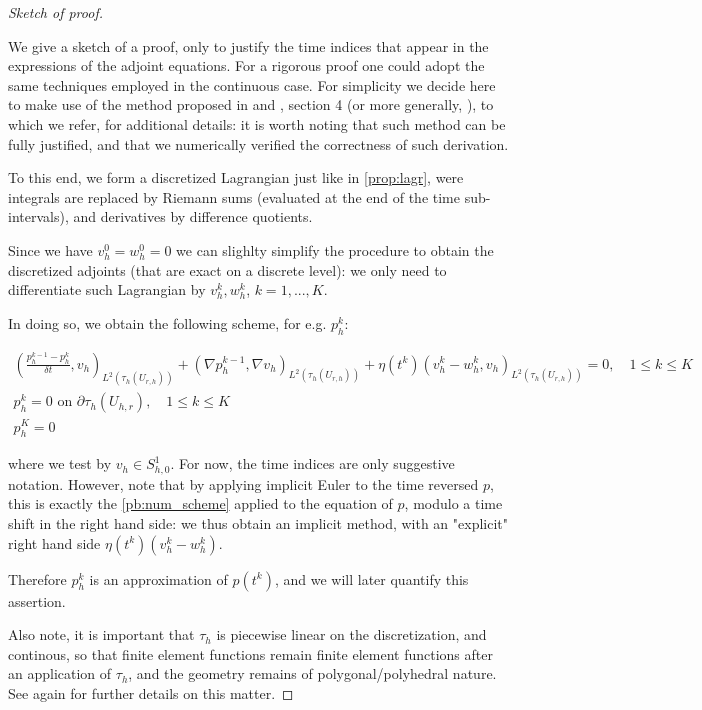 \documentclass[english,a4paper,9pt,oneside]{scrbook}	%
\theoremstyle{break}
\newenvironment{mproof}[1][\proofname]{%
  \begin{proof}[#1]$ $\par\nobreak\ignorespaces
}{%
  \end{proof}
}
\renewcommand*{\proofname}{Proof}
\theoremstyle{remark}
\begin{document}
\begin{mproof}[Sketch of proof]

We give a sketch of a proof, only to justify the time indices that appear in the expressions of the adjoint equations. For a rigorous proof one could adopt the same techniques employed in the continuous case. For simplicity we decide here to make use of the method proposed in and \cite{lindemann2}, section 4 (or more generally, \cite{lindemann}), to which we refer, for additional details: it is worth noting that such method can be fully justified, and that we numerically verified the correctness of such derivation.

To this end, we form a discretized Lagrangian just like in \cref{prop:lagr}, were integrals are replaced by Riemann sums (evaluated at the end of the time sub-intervals), and derivatives by difference quotients.

Since we have $v_h^0=w_h^0=0$ we can slighlty simplify the procedure to obtain the discretized adjoints (that are exact on a discrete level): we only need to differentiate such Lagrangian by $v_h^k, w_h^k$, $k=1,...,K$. 

In doing so, we obtain the following scheme, for e.g. $p_h^k$:

\begin{align*}
	\left ( \frac{p_h^{k-1}-p_h^k}{\delta t}, v_h\right )_{L^2(\tau_h(U_{r,h}))} + (\nabla p_h^{k-1}, \nabla v_h )_{L^2(\tau_h(U_{r,h}))} + \eta(t^k)(v_h^k-w_h^k,v_h)_{L^2(\tau_h(U_{r,h}))} = 0, \quad 1\leq k \leq K\\
	p_h^k = 0 \text{ on } \partial \tau_h (U_{h,r}), \quad 1\leq k \leq K\\
	p_h^K=0 
\end{align*}

where we test by $v_h \in S^1_{h,0}$. For now, the time indices are only suggestive notation. However, note that by applying implicit Euler to the time reversed $p$, this is exactly the \cref{pb:num_scheme} applied to the equation of $p$, modulo a time shift in the right hand side: we thus obtain an implicit method, with an "explicit" right hand side $\eta(t^k)(v_h^k-w_h^k)$.

Therefore $p_h^k$ is an approximation of  $p(t^k)$, and we will later quantify this assertion.

Also note, it is important that $\tau_h$ is piecewise linear on the discretization, and continous, so that finite element functions remain finite element functions after an application of $\tau_h$, and the geometry remains of polygonal/polyhedral nature. See again \cite{lindemann2} for further details on this matter.

\end{mproof}
\end{document}
